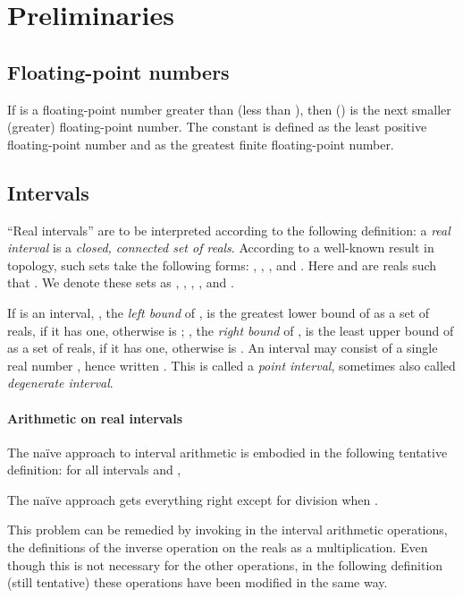 \documentclass[11pt]{article}
\begin{document}
\section{Preliminaries}
\label{preliminaries}

\subsection{Floating-point numbers}
If  is a floating-point number greater than  (less than
), then  () is the next smaller (greater)
floating-point number. The constant  is defined as the least
positive floating-point number and  as the greatest finite
floating-point number.

\subsection{Intervals}

``Real intervals'' are to be interpreted according to the following
definition: a \emph{real interval} is a \emph{closed, connected set of
  reals}.
According to a well-known result in topology,
such sets take the following forms:
,
,
,
 and .
Here  and  are reals such that .
We denote these sets as ,
, , , and .

If  is an interval, , the \emph{left bound} of ,
is the greatest lower bound of  as a set of reals,
if it has one, otherwise  is ;
, the \emph{right bound} of ,
is the least upper bound of  as a set of reals,
if it has one, otherwise  is .
An interval may consist of a single real number , hence written
.  This is called a \emph{point interval}, sometimes also
called \emph{degenerate interval}.

\paragraph{Arithmetic on real intervals}

The na\"{i}ve approach to interval arithmetic is embodied in the
following tentative definition:
for all intervals  and ,

The na\"{i}ve approach gets everything right
except for division when .


This problem can be remedied by invoking in the interval arithmetic
operations, the definitions of the inverse operation  on the reals
as a multiplication.  Even though this is not necessary for the other
operations, in the following definition (still tentative) these
operations have been modified in the same way.
\end{document}
